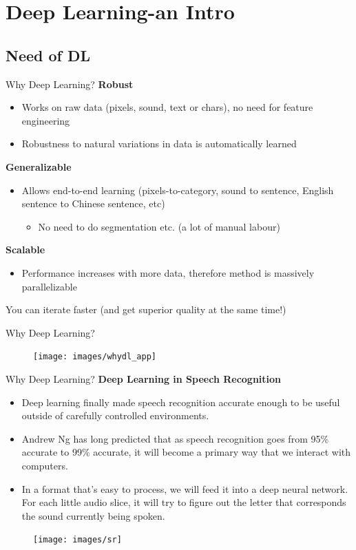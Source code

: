 \documentclass[10pt]{beamer}
\begin{document}
	\section{Deep Learning-an Intro}
	\subsection{Need of DL}
	\begin{frame}[c]{Why Deep Learning?}
	\pause
	\textbf{Robust}
	\begin{itemize}
		\item Works on raw data (\alert{pixels, sound, text or chars}), no need for feature engineering
		\item Robustness to natural variations in data is automatically learned
	\end{itemize}
	\pause
	\textbf{Generalizable}
	\begin{itemize}	
		\item Allows end-to-end learning (pixels-to-category, sound to sentence, English sentence to Chinese sentence, etc)
		\begin{itemize}
			\item No need to do segmentation etc. (a lot of manual labour)
		\end{itemize}
	\end{itemize}
	\pause
	\textbf{Scalable}
	\begin{itemize}
		\item Performance increases with more data, therefore method is massively parallelizable
	\end{itemize}
	\pause
	\huge You can iterate faster (and get superior quality at the same time!)
	\end{frame}
	\begin{frame}[c]{Why Deep Learning?}
		\begin{figure}
			\texttt{[image: images/whydl\_app]}
		\end{figure}
	\end{frame}
	\begin{frame}[c]{Why Deep Learning?}
		\textbf{Deep Learning in Speech Recognition}
		\begin{itemize}
			\item Deep learning finally made speech recognition accurate enough to be useful outside of carefully controlled environments.
			\item Andrew Ng has long predicted that as speech recognition goes from 95\% accurate to 99\%
			accurate, it will become a primary way that we interact with computers.
			\item In a format that’s easy to process, we will feed it into a deep neural network. For each little audio slice, it will try to figure out the letter that corresponds the sound currently being spoken.
		\end{itemize}
		\begin{figure}
			\texttt{[image: images/sr]}
		\end{figure}
	\end{frame}
\end{document}
